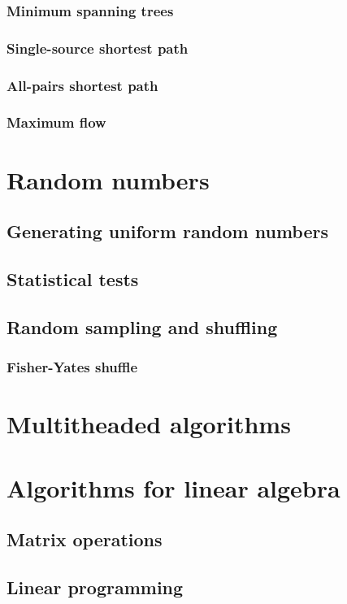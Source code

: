 \subsection{Minimum spanning trees}
\subsection{Single-source shortest path}
\subsection{All-pairs shortest path}
\subsection{Maximum flow}

\chapter{Random numbers}
\section{Generating uniform random numbers}
\section{Statistical tests}
\section{Random sampling and shuffling}
\subsection{Fisher-Yates shuffle}

\chapter{Multitheaded algorithms}

\chapter{Algorithms for linear algebra}
\section{Matrix operations}
\section{Linear programming}
